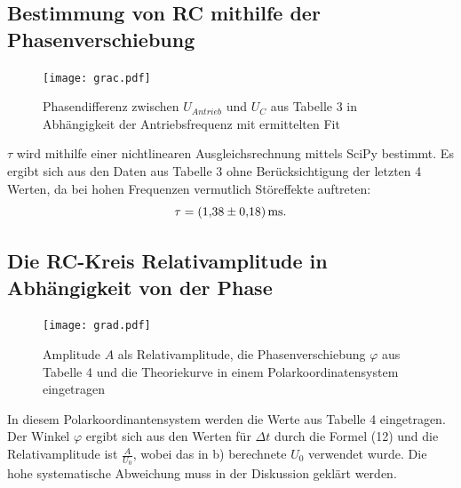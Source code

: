 \subsection{Bestimmung von RC mithilfe der Phasenverschiebung}
	 \begin{figure}[H]
	 	\centering
	 	\caption{Phasendifferenz zwischen $U_{Antrieb}$ und $U_C$ aus Tabelle 3 in Abhängigkeit der Antriebsfrequenz mit ermittelten Fit}
	 	\texttt{[image: grac.pdf]}
	 	\label{fig:grac}
	 \end{figure}
	 
	 $\tau$ wird mithilfe einer nichtlinearen Ausgleichsrechnung mittels SciPy \cite{scipy} bestimmt. Es ergibt sich aus den Daten aus Tabelle 3 ohne Berücksichtigung der letzten 4 Werten, da bei hohen Frequenzen vermutlich Störeffekte auftreten:
	 \begin{displaymath}
	 \tau = \SI{1.38 \pm 0.18}{\milli\second}\text{.}
	 \end{displaymath}


	 \subsection{Die RC-Kreis Relativamplitude in Abhängigkeit von der Phase}

	 \begin{figure}[H]
	  \centering
	  \caption{Amplitude $A$ als Relativamplitude, die Phasenverschiebung $\varphi$ aus Tabelle 4 und die Theoriekurve in einem Polarkoordinatensystem eingetragen}
	  \texttt{[image: grad.pdf]}
	  \label{fig:grad}
	 \end{figure}
	 
	 In diesem Polarkoordinantensystem werden die Werte aus Tabelle 4 eingetragen. Der Winkel $\varphi$ ergibt sich aus den Werten für $\Delta t$ durch die Formel (12) und die Relativamplitude ist $\frac{A}{U_{0}}$, wobei das in b) berechnete $U_{0}$ verwendet wurde. Die hohe systematische Abweichung muss in der Diskussion geklärt werden.



